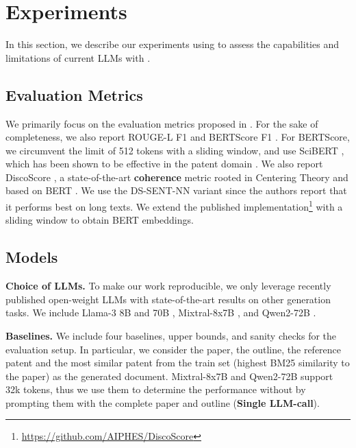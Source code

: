 \section{Experiments}

In this section, we describe our experiments using \DatasetName{} to assess the capabilities and limitations of current LLMs with \MethodName.

\subsection{Evaluation Metrics}
We primarily focus on the evaluation metrics proposed in .
For the sake of completeness, we also report ROUGE-L F1 \cite{linROUGEPackageAutomatic2004} and BERTScore F1 \cite{zhangBERTScoreEvaluatingText2020}.
For BERTScore, we circumvent the limit of 512 tokens with a sliding window, and use SciBERT \cite{beltagySciBERTPretrainedLanguage2019},
which has been shown to be effective in the patent domain \cite{pujariMultitaskApproachNeural2021}.
We also report DiscoScore \cite{zhao-etal-2023-discoscore}, a state-of-the-art \textbf{coherence} metric rooted in Centering Theory \cite{grosz-etal-1995-centering} and based on BERT \citep{devlin-etal-2019-bert}.
We use the DS-SENT-NN variant since the authors report that it performs best on long texts.
We extend the published implementation\footnote{\url{https://github.com/AIPHES/DiscoScore}} with a sliding window to obtain BERT embeddings.


\subsection{Models}

\noindent\textbf{Choice of LLMs. }
To make our work reproducible, we only leverage recently published open-weight LLMs with state-of-the-art results on other generation tasks.
We include Llama-3 8B and 70B \cite{dubeyLlamaHerdModels2024}, Mixtral-8x7B \cite{jiangMixtralExperts2024}, and Qwen2-72B \cite{yangQwen2TechnicalReport2024}.

\noindent\textbf{Baselines.}
We include four baselines, upper bounds, and sanity checks for the evaluation setup. 
In particular, we consider the paper, the outline, the reference patent and the most similar patent from the train set (highest BM25 similarity to the paper) as the generated document. %
Mixtral-8x7B and Qwen2-72B support 32k tokens, thus we use them to determine the performance without \MethodName by prompting them with the complete paper and outline (\textbf{Single LLM-call}).



